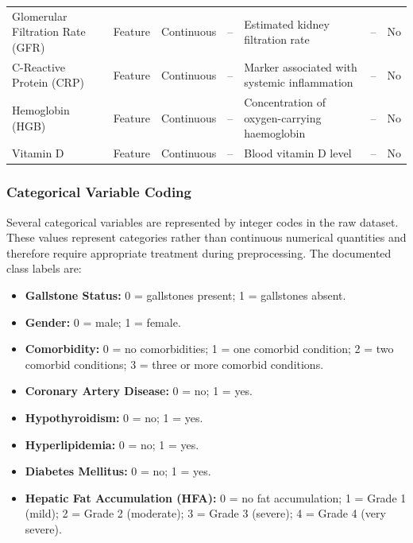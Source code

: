 \begin{longtable}{
    p{4.0cm}
    p{1.3cm}
    p{1.6cm}
    p{1.4cm}
    p{5.0cm}
    p{1.0cm}
    p{1.2cm}
}
Glomerular Filtration Rate (GFR)
& Feature & Continuous & --
& Estimated kidney filtration rate
& -- & No \\

C-Reactive Protein (CRP)
& Feature & Continuous & --
& Marker associated with systemic inflammation
& -- & No \\

Hemoglobin (HGB)
& Feature & Continuous & --
& Concentration of oxygen-carrying haemoglobin
& -- & No \\

Vitamin D
& Feature & Continuous & --
& Blood vitamin D level
& -- & No \\

\end{longtable}

\subsubsection{Categorical Variable Coding}
\label{subsubsec:categorical-coding}

Several categorical variables are represented by integer codes in the raw dataset. These values represent categories rather than continuous numerical quantities and therefore require appropriate treatment during preprocessing. The documented class labels are:

\begin{itemize}
    \item \textbf{Gallstone Status:}
    0 = gallstones present; 
    1 = gallstones absent.

    \item \textbf{Gender:}
    0 = male; 
    1 = female.

    \item \textbf{Comorbidity:}
    0 = no comorbidities;
    1 = one comorbid condition;
    2 = two comorbid conditions;
    3 = three or more comorbid conditions.

    \item \textbf{Coronary Artery Disease:}
    0 = no;
    1 = yes.

    \item \textbf{Hypothyroidism:}
    0 = no;
    1 = yes.

    \item \textbf{Hyperlipidemia:}
    0 = no;
    1 = yes.

    \item \textbf{Diabetes Mellitus:}
    0 = no;
    1 = yes.

    \item \textbf{Hepatic Fat Accumulation (HFA):}
    0 = no fat accumulation;
    1 = Grade 1 (mild);
    2 = Grade 2 (moderate);
    3 = Grade 3 (severe);
    4 = Grade 4 (very severe).
\end{itemize}

